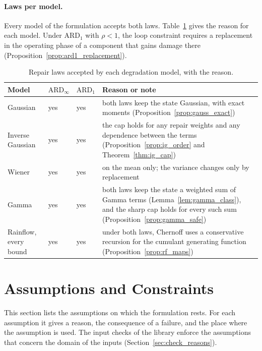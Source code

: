 \documentclass[11pt,a4paper]{article}
\theoremstyle{plain}
\theoremstyle{definition}
\theoremstyle{remark}
\begin{document}
\paragraph{Laws per model.}
Every model of the formulation accepts both laws.
Table~\ref{tab:laws_per_model} gives the reason for each model.
Under $\text{ARD}_1$ with $\rho < 1$, the loop constraint requires a replacement in the operating phase of a component that gains damage there (Proposition~\ref{prop:ard1_replacement}).

\begin{table}[htbp]
\centering
\caption{Repair laws accepted by each degradation model, with the reason.}
\label{tab:laws_per_model}
\small
\begin{tabularx}{\linewidth}{@{}lll>{\hsize=1.000\hsize\raggedright\arraybackslash}X@{}}
\toprule
\rowcolor{headgrey}
\textbf{Model} & $\text{ARD}_\infty$ & $\text{ARD}_1$ & \textbf{Reason or note} \\
\midrule
Gaussian & yes & yes & both laws keep the state Gaussian, with exact moments (Proposition~\ref{prop:gauss_exact}) \\
Inverse Gaussian & yes & yes & the cap holds for any repair weights and any dependence between the terms (Proposition~\ref{prop:ig_order} and Theorem~\ref{thm:ig_cap}) \\
Wiener & yes & yes & on the mean only; the variance changes only by replacement \\
Gamma & yes & yes & both laws keep the state a weighted sum of Gamma terms (Lemma~\ref{lem:gamma_class}), and the sharp cap holds for every such sum (Proposition~\ref{prop:gamma_safe}) \\
Rainflow, every bound & yes & yes & under both laws, Chernoff uses a conservative recursion for the cumulant generating function (Proposition~\ref{prop:rf_maps}) \\
\bottomrule
\end{tabularx}
\end{table}

\section{Assumptions and Constraints}
\label{sec:assumptions}

This section lists the assumptions on which the formulation rests.
For each assumption it gives a reason, the consequence of a failure, and the place where the assumption is used.
The input checks of the library enforce the assumptions that concern the domain of the inputs (Section~\ref{sec:check_reasons}).
\end{document}
